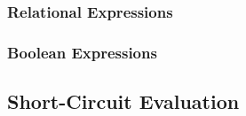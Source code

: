 \subsubsection{Relational Expressions}\label{subsubsec:Relational_Expressions}
\subsubsection{Boolean Expressions}\label{subsubsec:Boolean_Expressions}

\subsection{Short-Circuit Evaluation}\label{subsec:Short_Circuit_Evaluation}

